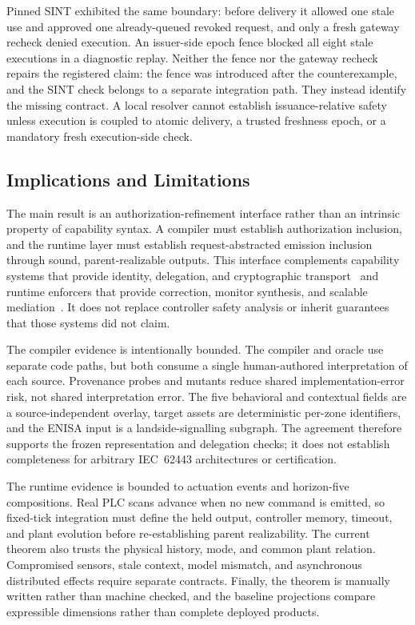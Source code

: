 Pinned SINT exhibited the same boundary: before delivery it allowed one stale use and approved one already-queued revoked request, and only a fresh gateway recheck denied execution. An issuer-side epoch fence blocked all eight stale executions in a diagnostic replay. Neither the fence nor the gateway recheck repairs the registered \zonecap{} claim: the fence was introduced after the counterexample, and the SINT check belongs to a separate integration path. They instead identify the missing contract. A local resolver cannot establish issuance-relative safety unless execution is coupled to atomic delivery, a trusted freshness epoch, or a mandatory fresh execution-side check.

\subsection{Implications and Limitations}

The main result is an authorization-refinement interface rather than an intrinsic property of capability syntax. A compiler must establish authorization inclusion, and the runtime layer must establish request-abstracted emission inclusion through sound, parent-realizable outputs. This interface complements capability systems that provide identity, delegation, and cryptographic transport~\cite{dodson2021,dodson2020,sint2026,bamil2026} and runtime enforcers that provide correction, monitor synthesis, and scalable mediation~\cite{pearce2020,lanotte2023,baird2024}. It does not replace controller safety analysis or inherit guarantees that those systems did not claim.

The compiler evidence is intentionally bounded. The compiler and oracle use separate code paths, but both consume a single human-authored interpretation of each source. Provenance probes and mutants reduce shared implementation-error risk, not shared interpretation error. The five behavioral and contextual fields are a source-independent overlay, target assets are deterministic per-zone identifiers, and the ENISA input is a landside-signalling subgraph. The agreement therefore supports the frozen representation and delegation checks; it does not establish completeness for arbitrary IEC~62443 architectures or certification.

The runtime evidence is bounded to actuation events and horizon-five compositions. Real PLC scans advance when no new command is emitted, so fixed-tick integration must define the held output, controller memory, timeout, and plant evolution before re-establishing parent realizability. The current theorem also trusts the physical history, mode, and common plant relation. Compromised sensors, stale context, model mismatch, and asynchronous distributed effects require separate contracts. Finally, the theorem is manually written rather than machine checked, and the baseline projections compare expressible dimensions rather than complete deployed products.

